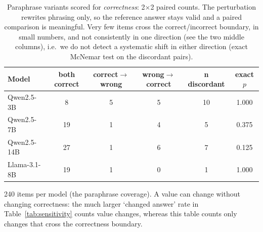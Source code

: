 \begin{table}[t]
  \centering
  \caption{Paraphrase variants scored for \emph{correctness}: 2$\times$2 paired counts.
           The perturbation rewrites phrasing only, so the reference answer stays valid
           and a paired comparison is meaningful. Very few items cross the
           correct/incorrect boundary, in small numbers, and not consistently in one
           direction (see the two middle columns), i.e.\ we do not detect a systematic
           shift in either direction (exact McNemar test on the discordant pairs).}
  \label{tab:wording-2x2}
  \small
  \begin{tabular}{@{}l c c c c c@{}}
    \toprule
    \textbf{Model} & \textbf{both correct} & \textbf{correct$\to$wrong} &
      \textbf{wrong$\to$correct} & \textbf{n discordant} & \textbf{exact $p$} \\
    \midrule
    Qwen2.5-3B & 8 & 5 & 5 & 10 & 1.000 \\
    Qwen2.5-7B & 19 & 1 & 4 & 5 & 0.375 \\
    Qwen2.5-14B & 27 & 1 & 6 & 7 & 0.125 \\
    Llama-3.1-8B & 19 & 1 & 0 & 1 & 1.000 \\
    \bottomrule
  \end{tabular}
  \vspace{2pt}
  \parbox{\linewidth}{\footnotesize 240 items per model (the paraphrase coverage). A
  value can change without changing correctness: the much larger `changed answer' rate
  in Table~\ref{tab:sensitivity} counts value changes, whereas this table counts only
  changes that cross the correctness boundary.}
\end{table}
